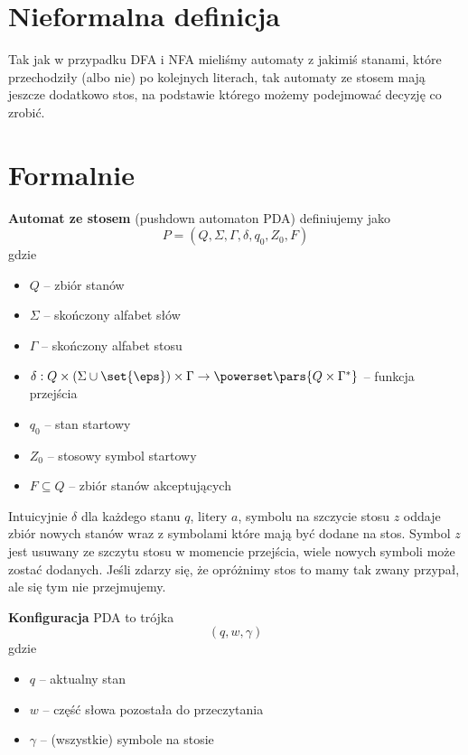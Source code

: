 \section{Nieformalna definicja}
Tak jak w przypadku DFA i NFA mieliśmy automaty z jakimiś stanami, które przechodziły (albo nie) po kolejnych literach, tak automaty ze stosem mają jeszcze dodatkowo stos, na podstawie którego możemy podejmować decyzję co zrobić.

\section{Formalnie}
\begin{definition}
	\textbf{Automat ze stosem} (pushdown automaton PDA) definiujemy jako
	\[
		P = (Q, \Sigma, \Gamma, \delta, q_0, Z_0, F)
	\]
	gdzie
	\begin{itemize}
		\item \( Q \) -- zbiór stanów
		\item \( \Sigma \) -- skończony alfabet słów
		\item \( \Gamma \) -- skończony alfabet stosu
		\item \( \delta : Q \times (\Sigma \cup \set{\eps}) \times \Gamma \rightarrow \powerset\pars{Q \times \Gamma^*} \) -- funkcja przejścia
		\item \( q_0 \) -- stan startowy
		\item \( Z_0\) -- stosowy symbol startowy
		\item \( F \subseteq Q \) -- zbiór stanów akceptujących
	\end{itemize}
\end{definition}
Intuicyjnie \( \delta \) dla każdego stanu \( q \), litery \( a \), symbolu na szczycie stosu \( z \) oddaje zbiór nowych stanów wraz z symbolami które mają być dodane na stos.
Symbol \( z \) jest usuwany ze szczytu stosu w momencie przejścia, wiele nowych symboli może zostać dodanych.
Jeśli zdarzy się, że opróżnimy stos to mamy tak zwany przypał, ale się tym nie przejmujemy.

\begin{definition}
	\textbf{Konfiguracja} PDA to trójka
	\[
		(q, w, \gamma)
	\]
	gdzie
	\begin{itemize}
		\item \( q \) -- aktualny stan
		\item \( w \) -- część słowa pozostała do przeczytania
		\item \( \gamma \) -- (wszystkie) symbole na stosie
	\end{itemize}
\end{definition}

